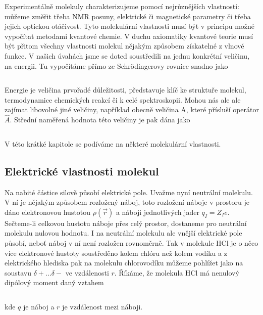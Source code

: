 Experimentálně molekuly charakterizujeme pomocí nejrůznějších vlastností: můžeme změřit třeba NMR posuny, elektrické či magnetické parametry či třeba jejich optickou otáčivost. Tyto molekulární vlastnosti musí být v principu možné vypočítat metodami kvantové chemie. V duchu axiomatiky kvantové teorie musí být přitom všechny vlastnosti molekul nějakým způsobem získatelné z vlnové funkce. V našich úvahách jsme se doteď soustředili na jednu konkrétní veličinu, na energii. Tu vypočítáme přímo ze Schr\"odingerovy rovnice snadno jako

\begin{equation}
\label{rov:XXX}
\end{equation}

Energie je veličina prvořadé důležitosti, představuje klíč ke struktuře molekul, termodynamice chemických reakcí či k celé spektroskopii. Mohou nás ale ale zajímat libovolné jiné veličiny, například obecně veličina A, které přísluší operátor $\hat{A}$. Střední naměřená hodnota této veličiny je pak dána jako

\begin{equation}
\label{rov:XXX}
\end{equation}

V této krátké kapitole se podíváme na některé molekulární vlastnosti.

  
\subsection{Elektrické vlastnosti molekul}
Na nabité částice silově působí elektrické pole. Uvažme nyní neutrální molekulu. V ní je nějakým způsobem rozložený náboj, toto rozložení náboje v prostoru je dáno elektronovou hustotou $\rho(\vec{r})$ a náboji jednotlivých jader $q_I=Z_I e$. Sečteme-li celkovou hustotu náboje přes celý prostor, dostaneme pro neutrální molekulu nulovou hodnotu. I na neutrální molekulu ale vnější elektrické pole působí, neboť náboj v ní není rozložen rovnoměrně. Tak v molekule HCl je o něco více elektronové hustoty soustředěno kolem chlóru než kolem vodíku a z elektrického hlediska pak na molekulu chlorovodíku můžeme pohlížet jako na soustavu $\delta +$...$\delta -$ ve vzdálenosti $r$. Říkáme, že molekula HCl má nenulový dipólový moment daný vztahem

\begin{equation}
\label{rov:XXX}
\end{equation}

\noindent kde $q$ je náboj a $r$ je vzdálenost mezi náboji. 

